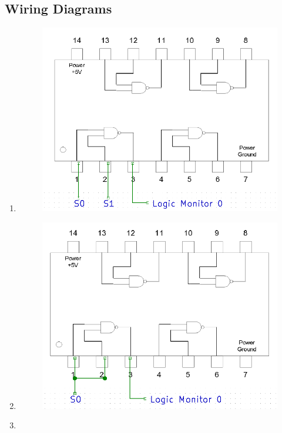 \documentclass[11pt,a4paper]{article}
\begin{document}
\subsection{Wiring Diagrams}
\begin{enumerate}
    \item
        \begin{figure}[H]
            \includegraphics[width=5in]{B1.png}
        \end{figure}
    \item
        \begin{figure}[H]
            \includegraphics[width=5in]{B2.png}
        \end{figure}
    \item

\end{enumerate}
\end{document}
